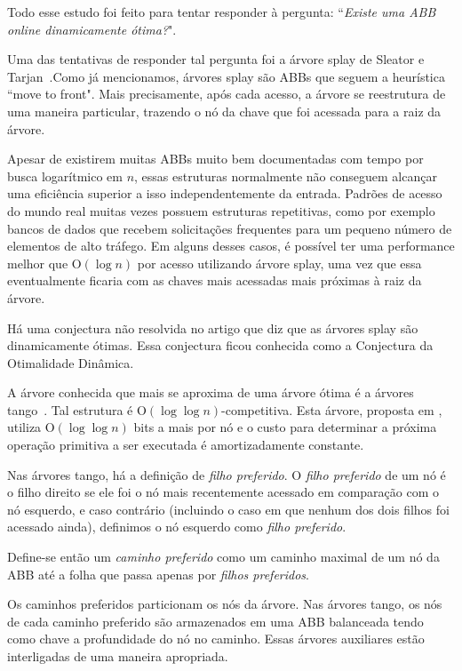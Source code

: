 Todo esse estudo foi feito para tentar responder à pergunta: ``\textit{Existe uma ABB online dinamicamente ótima?}".

Uma das tentativas de responder tal pergunta foi a árvore splay de Sleator e Tarjan~\cite{selfadjustingbst}.Como já mencionamos, árvores splay são ABBs que seguem a heurística ``move to front". Mais precisamente, após cada acesso, a árvore se reestrutura de uma maneira particular, trazendo o nó da chave que foi acessada para a raiz da árvore.

Apesar de existirem muitas ABBs muito bem documentadas com tempo por busca logarítmico em $n$, essas estruturas normalmente não conseguem alcançar uma eficiência superior a isso independentemente da entrada. Padrões de acesso do mundo real muitas vezes possuem estruturas repetitivas, como por exemplo bancos de dados que recebem solicitações frequentes para um pequeno número de elementos de alto tráfego. Em alguns desses casos, é possível ter uma performance melhor que O$(\log n)$ por acesso utilizando árvore splay, uma vez que essa eventualmente ficaria com as chaves mais acessadas mais próximas à raiz da árvore. 

Há uma conjectura não resolvida no artigo \cite{selfadjustingbst} que diz que as árvores splay são dinamicamente ótimas. Essa conjectura ficou conhecida como a Conjectura da Otimalidade Dinâmica.

A árvore conhecida que mais se aproxima de uma árvore ótima é a árvores tango~\cite{dynamicoptimality}. Tal estrutura é O$(\log \log n)$-competitiva. Esta árvore, proposta em \cite{dynamicoptimality}, utiliza O$(\log \log n)$ bits a mais por nó e o custo para determinar a próxima operação primitiva a ser executada é amortizadamente constante.

Nas árvores tango, há a definição de \textit{filho preferido}. O \textit{filho preferido} de um nó é o filho direito se ele foi o nó mais recentemente acessado em comparação com o nó esquerdo, e caso contrário (incluindo o caso em que nenhum dos dois filhos foi acessado ainda), definimos o nó esquerdo como \textit{filho preferido}.

Define-se então um \textit{caminho preferido} como um caminho maximal de um nó da ABB até a folha que passa apenas por \textit{filhos preferidos}. 

Os caminhos preferidos particionam os nós da árvore. Nas árvores tango, os nós de cada caminho preferido são armazenados em uma ABB balanceada tendo como chave a profundidade do nó no caminho. Essas árvores auxiliares estão interligadas de uma maneira apropriada.

